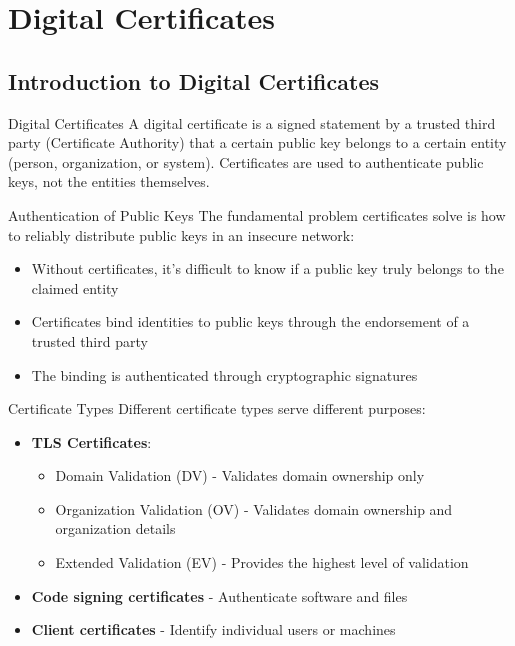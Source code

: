 \section{Digital Certificates}

\subsection{Introduction to Digital Certificates}

\begin{definition}{Digital Certificates}
A digital certificate is a signed statement by a trusted third party (Certificate Authority) that a certain public key belongs to a certain entity (person, organization, or system). Certificates are used to authenticate public keys, not the entities themselves.
\end{definition}

\begin{concept}{Authentication of Public Keys}
The fundamental problem certificates solve is how to reliably distribute public keys in an insecure network:
\begin{itemize}
    \item Without certificates, it's difficult to know if a public key truly belongs to the claimed entity
    \item Certificates bind identities to public keys through the endorsement of a trusted third party
    \item The binding is authenticated through cryptographic signatures
\end{itemize}
\end{concept}

\begin{definition}{Certificate Types}
Different certificate types serve different purposes:
\begin{itemize}
    \item \textbf{TLS Certificates}:
    \begin{itemize}
        \item Domain Validation (DV) - Validates domain ownership only
        \item Organization Validation (OV) - Validates domain ownership and organization details
        \item Extended Validation (EV) - Provides the highest level of validation
    \end{itemize}
    \item \textbf{Code signing certificates} - Authenticate software and files
    \item \textbf{Client certificates} - Identify individual users or machines
\end{itemize}
\end{definition}

